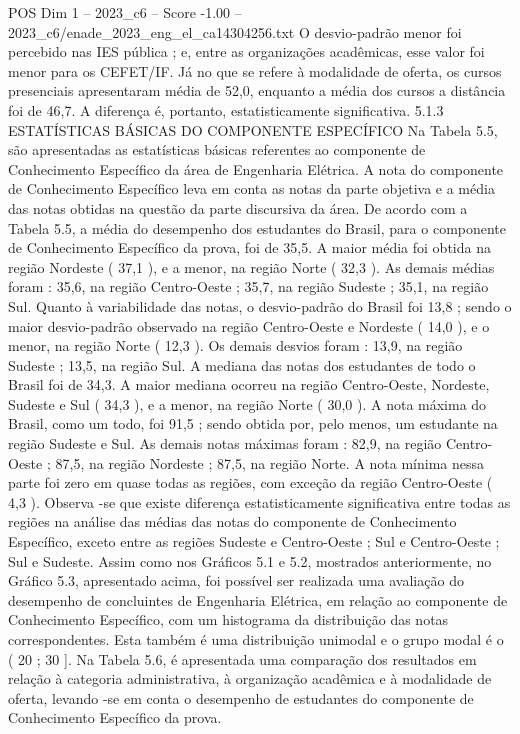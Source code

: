 \begin{textsample}{POS Dim 1 – 2023\_c6 – Score -1.00 – 2023\_c6/enade\_2023\_eng\_el\_ca14304256.txt}
O desvio-padrão menor foi percebido nas IES pública ; e, entre as organizações acadêmicas, esse valor foi menor para os CEFET/IF.
Já no que se refere à modalidade de oferta, os cursos presenciais apresentaram média de 52,0, enquanto a média dos cursos a distância foi de 46,7.
A diferença é, portanto, estatisticamente significativa. 5.1.3 ESTATÍSTICAS BÁSICAS DO COMPONENTE ESPECÍFICO Na Tabela 5.5, são apresentadas as estatísticas básicas referentes ao componente de Conhecimento Específico da área de Engenharia Elétrica.
A nota do componente de Conhecimento Específico leva em conta as notas da parte objetiva e a média das notas obtidas na questão da parte discursiva da área.
De acordo com a Tabela 5.5, a média do desempenho dos estudantes do Brasil, para o componente de Conhecimento Específico da prova, foi de 35,5.
A maior média foi obtida na região Nordeste ( 37,1 ), e a menor, na região Norte ( 32,3 ).
As demais médias foram : 35,6, na região Centro-Oeste ; 35,7, na região Sudeste ; 35,1, na região Sul.
Quanto à variabilidade das notas, o desvio-padrão do Brasil foi 13,8 ; sendo o maior desvio-padrão observado na região Centro-Oeste e Nordeste ( 14,0 ), e o menor, na região Norte ( 12,3 ).
Os demais desvios foram : 13,9, na região Sudeste ; 13,5, na região Sul.
A mediana das notas dos estudantes de todo o Brasil foi de 34,3.
A maior mediana ocorreu na região Centro-Oeste, Nordeste, Sudeste e Sul ( 34,3 ), e a menor, na região Norte ( 30,0 ).
A nota máxima do Brasil, como um todo, foi 91,5 ; sendo obtida por, pelo menos, um estudante na região Sudeste e Sul.
As demais notas máximas foram : 82,9, na região Centro-Oeste ; 87,5, na região Nordeste ; 87,5, na região Norte.
A nota mínima nessa parte foi zero em quase todas as regiões, com exceção da região Centro-Oeste ( 4,3 ).
Observa -se que existe diferença estatisticamente significativa entre todas as regiões na análise das médias das notas do componente de Conhecimento Específico, exceto entre as regiões Sudeste e Centro-Oeste ; Sul e Centro-Oeste ; Sul e Sudeste.
Assim como nos Gráficos 5.1 e 5.2, mostrados anteriormente, no Gráfico 5.3, apresentado acima, foi possível ser realizada uma avaliação do desempenho de concluintes de Engenharia Elétrica, em relação ao componente de Conhecimento Específico, com um histograma da distribuição das notas correspondentes.
Esta também é uma distribuição unimodal e o grupo modal é o ( 20 ; 30 ].
Na Tabela 5.6, é apresentada uma comparação dos resultados em relação à categoria administrativa, à organização acadêmica e à modalidade de oferta, levando -se em conta o desempenho de estudantes do componente de Conhecimento Específico da prova.

\end{textsample}
